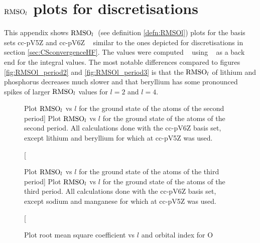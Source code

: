 \chapter{$\text{RMSO}_l$ plots for \cGTO discretisations}
\label{apx:GaussianUHF}

This appendix shows $\text{RMSO}_l$~(see definition \vref{defn:RMSOl})
plots for the \cGTO basis sets
cc-pV5Z and cc-pV6Z%
~\cite{Dunning1989,Woon1993,Wilson1996,VanMourik2000,Prascher2011}
similar to the ones depicted for \CS discretisations
in section \vref{sec:CSconvergenceHF}.
The values were computed \molsturm~\cite{molsturmWeb,molsturmDesign}
using \libint~\cite{Libint2_231} as a back end
for the integral values.
The most notable differences compared to figures \ref{fig:RMSOl_period2}
and \vref{fig:RMSOl_period3}
is that the $\text{RMSO}_l$ of lithium and phosphorus
decreases much slower and
that beryllium has some pronounced spikes of larger $\text{RMSO}_l$
values for $l=2$ and $l=4$.

\begin{figure}[hp!]
	\centering
	\caption
	[Plot $\text{RMSO}_l$ vs $l$ for the \HF ground state of the atoms of the second period]
	{
		Plot $\text{RMSO}_l$ vs $l$ for the \HF ground state
		of the atoms of the second period.
		All calculations done with the cc-pV6Z basis set,
		except lithium and beryllium
		for which at cc-pV5Z was used.
	}
	\label{fig:RMSO_period2_l}
\end{figure}

\begin{figure}[hp!]
	\centering
	\caption
	[Plot $\text{RMSO}_l$ vs $l$ for the \HF ground state of the atoms of the third period]
	{
		Plot $\text{RMSO}_l$ vs $l$ for the \HF ground state
		of the atoms of the third period.
		All calculations done with the cc-pV6Z basis set,
		except sodium and manganese
		for which at cc-pV5Z was used.
	}
	\label{fig:RMSO_period3_l}
\end{figure}

%

\begin{figure}[hp!]
	\centering
	\caption{Plot root mean square coefficient vs $l$ and orbital index for O}
	\label{fig:RMSLF_O_Gauss}
\end{figure}


